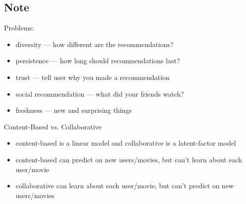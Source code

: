 \documentclass[10pt,landscape,a4paper]{article}
\begin{document}
\begin{multicols*}{5}
\subsection{Note}
Problems:
\begin{itemize}
    \item diversity --- how different are the recommendations?
    \item persistence --- how long should recommendations last?
    \item trust --- tell user why you made a recommendation
    \item social recommendation --- what did your friends watch?
    \item freshness --- new and surprising things
\end{itemize}
Content-Based vs. Collaborative
\begin{itemize}
    \item content-based is a linear model and collaborative is a latent-factor model
    \item content-based can predict  on new users/movies, but can't learn about each user/movie
    \item collaborative can learn about each user/movie, but can't predict on new users/movies
\end{itemize}


\end{multicols*}
\end{document}
